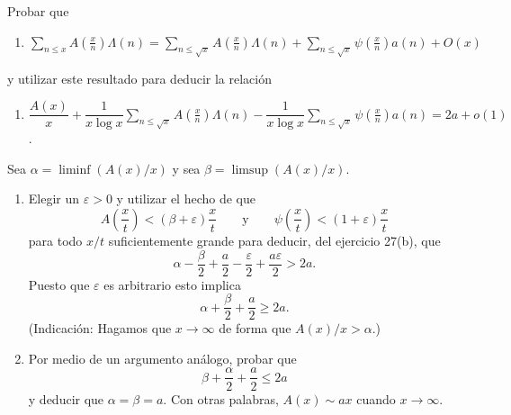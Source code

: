 \documentclass[12pt,a4paper]{book}
\begin{document}
    \begin{ejercicio}
        Probar que
        \begin{enumerate}
            \item[(a)] $\displaystyle\sum_{n\leq x}A\left(\frac{x}{n}\right)\Lambda(n)
            =\sum_{n\leq\sqrt{x}}A\left(\frac{x}{n}\right)\Lambda(n)
            +\sum_{n\leq\sqrt{x}}\psi\left(\frac{x}{n}\right)a(n)+O(x)$
        \end{enumerate}
        y utilizar este resultado para deducir la relación
        \begin{enumerate}
            \item[(b)] $\dfrac{A(x)}{x}+\dfrac{1}{x\log x}\displaystyle\sum_{n\leq\sqrt{x}}
            A\left(\frac{x}{n}\right)\Lambda(n)-\dfrac{1}{x\log x}\sum_{n\leq\sqrt{x}}
            \psi\left(\frac{x}{n}\right)a(n)=2a+o(1)$.
        \end{enumerate}
    \end{ejercicio}

    \begin{ejercicio}
        Sea $\alpha=\liminf(A(x)/x)$ y sea $\beta=\limsup(A(x)/x)$.
        \begin{enumerate}
            \item[(a)] Elegir un $\varepsilon>0$ y utilizar el hecho de que
            \begin{equation*}
                A\left(\frac{x}{t}\right)<(\beta+\varepsilon)\frac{x}{t}\qquad\text{y}\qquad
                \psi\left(\frac{x}{t}\right)<(1+\varepsilon)\frac{x}{t}
            \end{equation*}
            para todo $x/t$ suficientemente grande para deducir, del ejercicio
            27(b), que
            \begin{equation*}
                \alpha-\frac{\beta}{2}+\frac{a}{2}-\frac{\varepsilon}{2}+\frac{a\varepsilon}{2}>2a.
            \end{equation*}
            Puesto que $\varepsilon$ es arbitrario esto implica
            \begin{equation*}
                \alpha+\frac{\beta}{2}+\frac{a}{2}\geq2a.
            \end{equation*}
            (Indicación: Hagamos que $x\to\infty$ de forma que $A(x)/x>\alpha$.)
            \item[(b)] Por medio de un argumento análogo, probar que
            \begin{equation*}
                \beta+\frac{\alpha}{2}+\frac{a}{2}\leq2a
            \end{equation*}
            y deducir que $\alpha=\beta=a$. Con otras palabras, $A(x)\sim ax$ cuando
            $x\to\infty$.
        \end{enumerate}
    \end{ejercicio}
\end{document}
